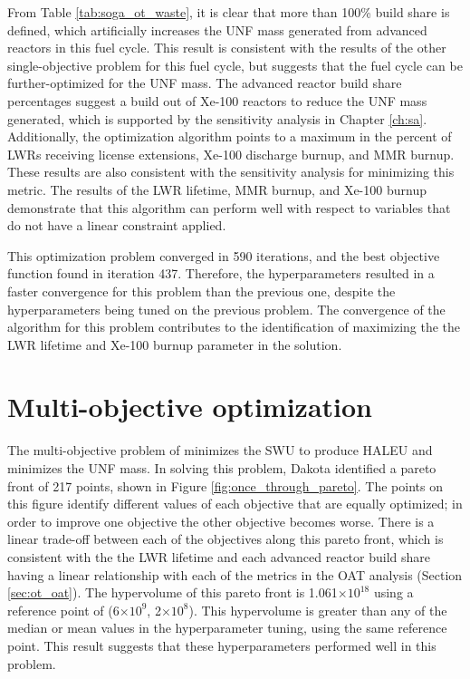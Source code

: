 From Table \ref{tab:soga_ot_waste}, it is clear that more than 100\% build share
is defined, which artificially increases the \gls{UNF} mass generated from 
advanced reactors in this fuel cycle. This result is consistent with the results of 
the other single-objective problem for this fuel cycle, but suggests 
that the fuel cycle can be further-optimized for the \gls{UNF} mass. 
The advanced reactor build share percentages suggest 
a build out of Xe-100 reactors to reduce the \gls{UNF} mass generated, which 
is supported by the sensitivity analysis in Chapter \ref{ch:sa}. Additionally, 
the optimization algorithm points to a maximum in the percent of \glspl{LWR} 
receiving license extensions, Xe-100 discharge burnup, and \gls{MMR} burnup. 
These results are also consistent with the sensitivity analysis 
for minimizing this metric. The results of the 
\gls{LWR} lifetime, \gls{MMR} burnup, and Xe-100 burnup demonstrate that this 
algorithm can perform well with respect to variables that do not have a 
linear constraint applied. 

This optimization problem converged in 590 iterations, and the best objective 
function found in iteration 437. Therefore, the hyperparameters resulted 
in a faster convergence for this problem than the previous one, despite the 
hyperparameters being tuned on the previous problem. The convergence of 
the algorithm for this problem contributes to the identification 
of maximizing the the \gls{LWR} lifetime and Xe-100 burnup parameter 
in the solution. 

\section{Multi-objective optimization}
The multi-objective problem of minimizes the \gls{SWU} to produce 
\gls{HALEU} and minimizes the \gls{UNF} mass. In solving 
this problem, Dakota identified a pareto front 
of 217 points, shown in Figure \ref{fig:once_through_pareto}. The points 
on this figure identify different values of each objective that are equally 
optimized; in order to improve one objective the other objective becomes 
worse. There is a linear trade-off between each of the objectives along this 
pareto front, which is consistent with the the \gls{LWR} lifetime and 
each advanced reactor build share having a linear relationship with 
each of the metrics in the \gls{OAT} analysis (Section \ref{sec:ot_oat}). 
The hypervolume of this pareto front is 1.061$\times 10^{18}$ using a 
reference point of (6$\times 10^9$, 2$\times 10^8$). This hypervolume is 
greater than any of the median or mean values in the hyperparameter tuning,
using the same reference point. This result suggests that these hyperparameters 
performed well in this problem. 


